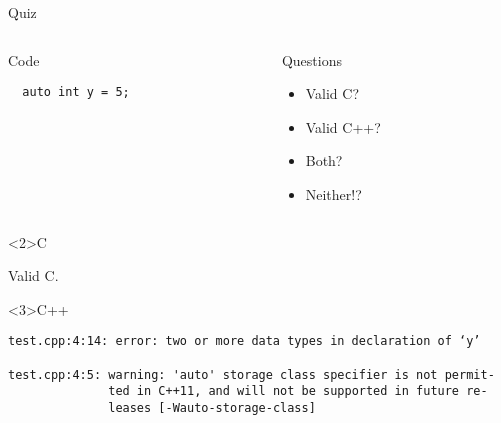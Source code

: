\documentclass[presentation,aspectratio=169]{beamer}
\begin{document}
\begin{frame}[fragile,label={sec:org23c4234}]{Quiz}
\begin{columns}
\begin{column}{0.48\columnwidth}
\begin{block}{Code}
\begin{verbatim}
  auto int y = 5;
\end{verbatim}
\end{block}
\end{column}

\begin{column}{0.48\columnwidth}
\begin{block}{Questions}
\begin{itemize}
\item Valid C?
\item Valid C++?
\item Both?
\item Neither!?
\end{itemize}
\end{block}
\end{column}
\end{columns}

\begin{block}<2>{C}

Valid C.

\end{block}
\vspace{-1cm}
\begin{block}<3>{C++}
\begin{verbatim}
test.cpp:4:14: error: two or more data types in declaration of ‘y’

test.cpp:4:5: warning: 'auto' storage class specifier is not permit-
              ted in C++11, and will not be supported in future re-
              leases [-Wauto-storage-class]
\end{verbatim}
\end{block}
\end{frame}

\end{document}

